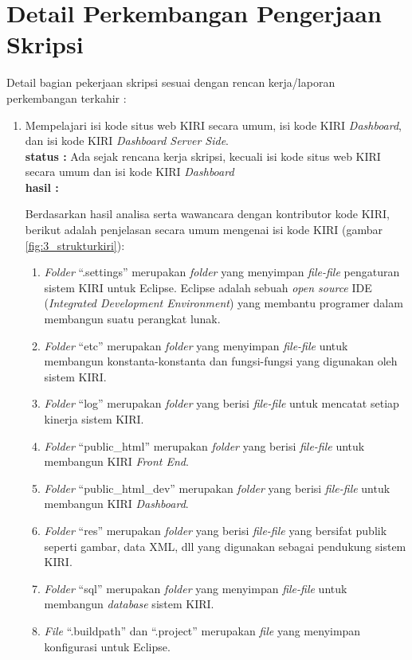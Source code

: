\documentclass[a4paper,twoside]{article}
\begin{document}
\section{Detail Perkembangan Pengerjaan Skripsi}
Detail bagian pekerjaan skripsi sesuai dengan rencan kerja/laporan perkembangan terkahir :
	\begin{enumerate}
		\item Mempelajari isi kode situs web KIRI secara umum, isi kode KIRI \textit{Dashboard}, dan isi kode KIRI \textit{Dashboard Server Side}.\\
		{\bf status :} Ada sejak rencana kerja skripsi, kecuali isi kode situs web KIRI secara umum dan isi kode KIRI \textit{Dashboard}\\
		{\bf hasil :}
		
Berdasarkan hasil analisa serta wawancara dengan kontributor kode KIRI, berikut adalah penjelasan secara umum mengenai isi kode KIRI (gambar \ref{fig:3_strukturkiri}):
\begin{enumerate}
	\item \textit{Folder} ``.settings'' merupakan \textit{folder} yang menyimpan \textit{file-file} pengaturan sistem KIRI untuk Eclipse. Eclipse adalah sebuah \textit{open source} IDE (\textit{Integrated Development Environment}) yang membantu programer dalam membangun suatu perangkat lunak\cite{eclipse}.
	\item \textit{Folder} ``etc'' merupakan \textit{folder} yang menyimpan \textit{file-file} untuk membangun konstanta-konstanta dan fungsi-fungsi yang digunakan oleh sistem KIRI.
	\item \textit{Folder} ``log'' merupakan \textit{folder} yang berisi \textit{file-file} untuk mencatat setiap kinerja sistem KIRI.
	\item \textit{Folder} ``public\_html'' merupakan \textit{folder} yang berisi \textit{file-file} untuk membangun KIRI \textit{Front End}.
	\item \textit{Folder} ``public\_html\_dev'' merupakan \textit{folder} yang berisi \textit{file-file} untuk membangun KIRI \textit{Dashboard}.
	\item \textit{Folder} ``res'' merupakan \textit{folder} yang berisi \textit{file-file} yang bersifat publik seperti gambar, data XML, dll yang digunakan sebagai pendukung sistem KIRI.
	\item \textit{Folder} ``sql'' merupakan \textit{folder} yang menyimpan \textit{file-file} untuk membangun \textit{database} sistem KIRI.
	\item \textit{File} ``.buildpath'' dan ``.project'' merupakan \textit{file} yang menyimpan konfigurasi untuk Eclipse.

\end{enumerate}
\end{enumerate}
\end{document}
